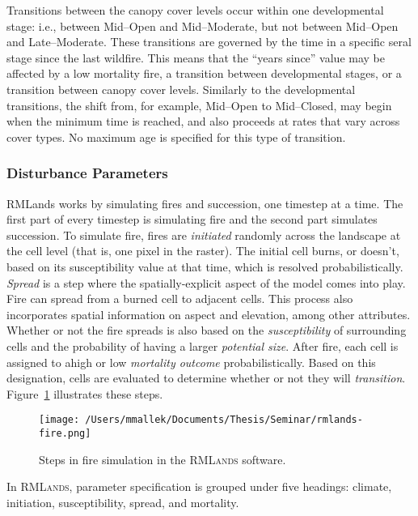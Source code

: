 Transitions between the canopy cover levels occur within one developmental stage: i.e., between Mid--Open and Mid--Moderate, but not between Mid--Open and Late--Moderate. These transitions are governed by the time in a specific seral stage since the last wildfire. This means that the ``years since'' value may be affected by a low mortality fire, a transition between developmental stages, or a transition between canopy cover levels. Similarly to the developmental transitions, the shift from, for example, Mid--Open to Mid--Closed, may begin when the minimum time is reached, and also proceeds at rates that vary across cover types. No maximum age is specified for this type of transition.

\subsubsection*{Disturbance Parameters} 
\label{subsubsec:distparams}

RMLands works by simulating fires and succession, one timestep at a time. The first part of every timestep is simulating fire and the second part simulates succession. To simulate fire, fires are \emph{initiated} randomly across the landscape at the cell level (that is, one pixel in the raster). The initial cell burns, or doesn't, based on its susceptibility value at that time, which is resolved probabilistically. \emph{Spread} is a step where the spatially-explicit aspect of the model comes into play. Fire can spread from a burned cell to adjacent cells. This process also incorporates spatial information on aspect and elevation, among other attributes. Whether or not the fire spreads is also based on the \emph{susceptibility} of surrounding cells and the probability of having a larger \emph{potential size}. After fire, each cell is assigned to ahigh or low \emph{mortality outcome} probabilistically. Based on this designation, cells are evaluated to determine whether or not they will \emph{transition}. Figure~\ref{fig:rmlands-fire-steps} illustrates these steps.

\begin{figure}[htbp]
\centering
\texttt{[image: /Users/mmallek/Documents/Thesis/Seminar/rmlands-fire.png]}
\caption{Steps in fire simulation in the \textsc{RMLands} software.} 
\label{fig:rmlands-fire-steps}
\end{figure}

In \textsc{RMLands}, parameter specification is grouped under five headings: climate, initiation, susceptibility, spread, and mortality.


